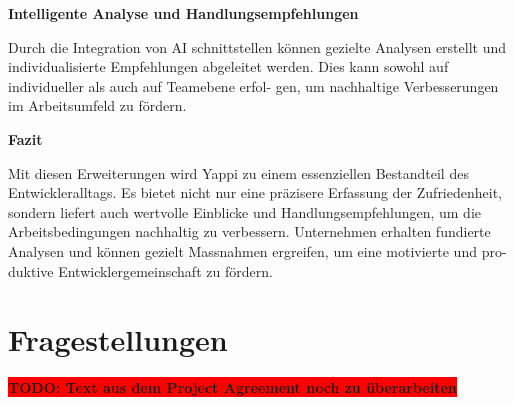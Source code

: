 \documentclass[12pt,a4paper]{report}
\newcommand{\todo}[1]{\colorbox{red}{\textbf{TODO: #1}}}
\begin{document}
\textbf{Intelligente Analyse und Handlungsempfehlungen}

Durch die Integration von AI schnittstellen können gezielte Analysen erstellt und individualisierte
Empfehlungen abgeleitet werden. Dies kann sowohl auf individueller als auch auf Teamebene erfol-
gen, um nachhaltige Verbesserungen im Arbeitsumfeld zu fördern.

\textbf{Fazit}

Mit diesen Erweiterungen wird Yappi zu einem essenziellen Bestandteil des Entwickleralltags. Es
bietet nicht nur eine präzisere Erfassung der Zufriedenheit, sondern liefert auch wertvolle Einblicke
und Handlungsempfehlungen, um die Arbeitsbedingungen nachhaltig zu verbessern. Unternehmen
erhalten fundierte Analysen und können gezielt Massnahmen ergreifen, um eine motivierte und pro-
duktive Entwicklergemeinschaft zu fördern.

\section{Fragestellungen}

\todo{Text aus dem Project Agreement noch zu überarbeiten}
\end{document}
